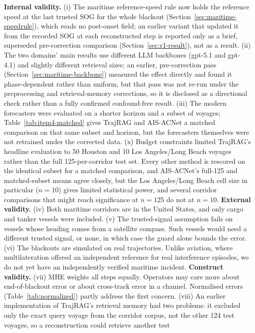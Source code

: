 \textbf{Internal validity.} (i) The maritime reference-speed rule now holds
the reference speed at the last trusted SOG for the whole blackout
(Section~\ref{sec:maritime-speedrule}), which reads no post-onset field; an
earlier variant that updated it from the recorded SOG at each reconstructed
step is reported only as a brief, superseded pre-correction comparison
(Section~\ref{sec:r1-result}), not as a result. (ii) The two domains' main
results use different LLM backbones (gpt-5.1 and gpt-4.1) and slightly
different retrieval sizes; an earlier, pre-correction pass
(Section~\ref{sec:maritime-backbone}) measured the effect directly and
found it phase-dependent rather than uniform, but that pass was not
re-run under the preprocessing and retrieval-memory corrections, so it is
disclosed as a directional check rather than a fully confirmed
confound-free result. (iii) The modern forecasters were evaluated on
a shorter horizon and a subset of voyages; Table~\ref{tab:item4-matched}
gives TrajRAG and AIS-ACNet a matched comparison on that same subset and
horizon, but the forecasters themselves were not retrained under the
corrected data. (x) Budget constraints limited TrajRAG's headline
evaluation to 50 Houston and 10 Los Angeles/Long Beach voyages rather than
the full 125-per-corridor test set. Every other method is rescored on the
identical subset for a matched comparison, and AIS-ACNet's full-125 and
matched-subset means agree closely, but the Los Angeles/Long Beach cell
size in particular ($n=10$) gives limited statistical power, and several
corridor comparisons that might reach significance at $n=125$ do not at
$n=10$. \textbf{External validity.} (iv)
Both maritime corridors are in the United States, and only cargo and tanker
vessels were included. (v) The trusted-signal assumption fails on vessels
whose heading comes from a satellite compass. Such vessels would need a
different trusted signal, or none, in which case the guard alone bounds the
error. (vi) The blackouts are simulated on real trajectories. Unlike
aviation, where multilateration offered an independent reference for real
interference episodes, we do not yet have an independently verified
maritime incident. \textbf{Construct validity.} (vii) MHE weights all steps
equally. Operators may care more about end-of-blackout error or about
cross-track error in a channel. Normalised errors
(Table~\ref{tab:normalized}) partly address the first concern. (viii) An
earlier implementation of TrajRAG's retrieval memory had two problems: it
excluded only the exact query voyage from the corridor corpus, not the
other 124 test voyages, so a reconstruction could retrieve another test
